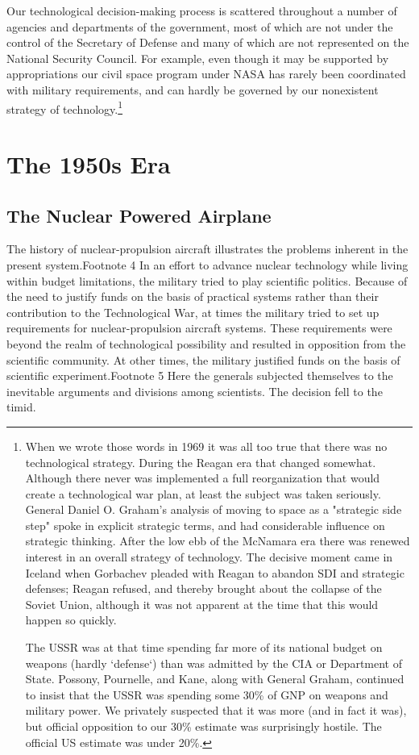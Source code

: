 \documentclass[a4paper,12pt]{book}
\begin{document}
Our technological decision-making process is scattered throughout a number of agencies and departments of the government, most of which are not under the control of the Secretary of Defense and many of which are not represented on the National Security Council. For example, even though it may be supported by appropriations our civil space program under NASA has rarely been coordinated with military requirements, and can hardly be governed by our nonexistent strategy of technology.\footnote{
When we wrote those words in 1969 it was all too true that there was no technological strategy. During the Reagan era that changed somewhat. Although there never was implemented a full reorganization that would create a technological war plan, at least the subject was taken seriously. General Daniel O. Graham's analysis of moving to space as a "strategic side step" spoke in explicit strategic terms, and had considerable influence on strategic thinking.
After the low ebb of the McNamara era there was renewed interest in an overall strategy of technology. The decisive moment came in Iceland when Gorbachev pleaded with Reagan to abandon SDI and strategic defenses; Reagan refused, and thereby brought about the collapse of the Soviet Union, although it was not apparent at the time that this would happen so quickly.

The USSR was at that time spending far more of its national budget on weapons (hardly `defense`) than was admitted by the CIA or Department of State. Possony, Pournelle, and Kane, along with General Graham, continued to insist that the USSR was spending some 30\% of GNP on weapons and military power. We privately suspected that it was more (and in fact it was), but official opposition to our 30\% estimate was surprisingly hostile. The official US estimate was under 20\%.}

\section{The 1950s Era}
\subsection{The Nuclear Powered Airplane}
The history of nuclear-propulsion aircraft illustrates the problems inherent in the present system.Footnote 4 In an effort to advance nuclear technology while living within budget limitations, the military tried to play scientific politics. Because of the need to justify funds on the basis of practical systems rather than their contribution to the Technological War, at times the military tried to set up requirements for nuclear-propulsion aircraft systems. These requirements were beyond the realm of technological possibility and resulted in opposition from the scientific community. At other times, the military justified funds on the basis of scientific experiment.Footnote 5 Here the generals subjected themselves to the inevitable arguments and divisions among scientists. The decision fell to the timid.
\end{document}
